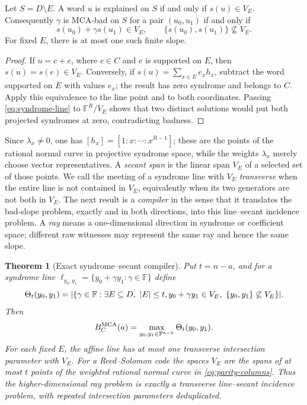 \documentclass[11pt,a4paper]{amsart}
\numberwithin{equation}{section}
\newtheorem{theorem}{Theorem}[section]
\theoremstyle{remark}
\newcommand{\F}{\mathbb F}\newcommand{\B}{\mathbb B}\newcommand{\K}{\mathbb K}\newcommand{\Z}{\mathbb Z}
\begin{document}
\begin{proposition}
\label{prop:syndrome-line-normal-form}
Let \(S=D\setminus E\).  A word \(u\) is explained on \(S\) if and only if
\(s(u)\in V_E\).  Consequently \(\gamma\) is MCA-bad on \(S\) for a pair
\((u_0,u_1)\) if and only if
\begin{equation}
 s(u_0)+\gamma s(u_1)\in V_E,
 \qquad
 \{s(u_0),s(u_1)\}\not\subseteq V_E.\label{eq:syndrome-line}
\end{equation}
For fixed \(E\), there is at most one such finite slope.
\end{proposition}

\begin{proof}
If \(u=c+e\), where \(c\in C\) and \(e\) is supported on \(E\), then
\(s(u)=s(e)\in V_E\).  Conversely, if
\(s(u)=\sum_{x\in E}e_xh_x\), subtract the word supported on \(E\) with
values \(e_x\); the result has zero syndrome and belongs to \(C\).  Apply
this equivalence to the line point and to both coordinates.  Passing
\eqref{eq:syndrome-line} to \(\F^R/V_E\) shows that two distinct solutions
would put both projected syndromes at zero, contradicting badness.
\end{proof}

Since \(\lambda_x\ne0\), one has
\([h_x]=[1:x:\cdots:x^{R-1}]\); these are the points of the rational
normal curve in projective syndrome space, while the weights
\(\lambda_x\) merely choose vector representatives.  A \emph{secant span} is the linear span
\(V_E\) of a selected set of those points.  We call the meeting of a
syndrome line with \(V_E\) \emph{transverse} when the entire line is not
contained in \(V_E\), equivalently when its two generators are not both in
\(V_E\).  The next result is a \emph{compiler} in the sense that it
translates the bad-slope problem, exactly and in both directions, into this
line--secant incidence problem.  A \emph{ray} means a one-dimensional
direction in syndrome or coefficient space; different raw witnesses may
represent the same ray and hence the same slope.

\begin{theorem}[Exact syndrome--secant compiler]
\label{thm:syndrome-secant-exact}
Put \(t=n-a\), and for a syndrome line
\(\ell_{y_0,y_1}=\{y_0+\gamma y_1:\gamma\in\F\}\) define
\begin{equation}
 \Theta_t(y_0,y_1)=
 \abs{\{\gamma\in\F:\exists E\subseteq D,\ \abs E\le t,
 y_0+\gamma y_1\in V_E,
 \ \{y_0,y_1\}\not\subseteq V_E\}}.\label{eq:transverse-secant-count}
\end{equation}
Then
\begin{equation}
 B_C^{\rm MCA}(a)=\max_{y_0,y_1\in\F^{n-k}}
                    \Theta_t(y_0,y_1).\label{eq:exact-secant-numerator}
\end{equation}
For each fixed \(E\), the affine line has at most one transverse
intersection parameter with \(V_E\).  For a Reed--Solomon code the
spaces \(V_E\) are the spans of at most \(t\) points of the weighted
rational normal curve in \eqref{eq:parity-columns}.  Thus the
higher-dimensional ray problem is exactly a transverse line--secant
incidence problem, with repeated intersection parameters deduplicated.
\end{theorem}
\end{document}
